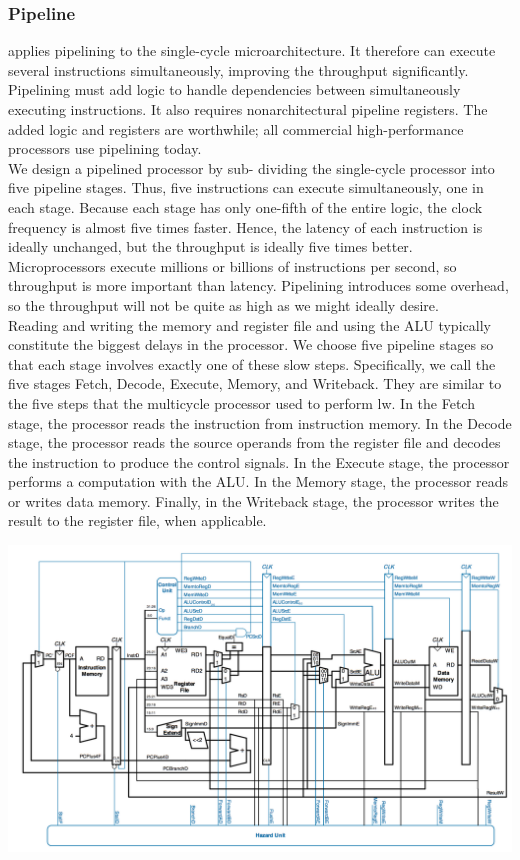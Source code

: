 		\subsubsection{Pipeline}
			applies pipelining to the single-cycle microarchitecture. It therefore can execute several instructions simultaneously, improving the throughput significantly. Pipelining must add logic to handle dependencies between simultaneously executing instructions. It also requires nonarchitectural pipeline registers. The added logic and registers are worthwhile; all commercial high-performance processors use pipelining today.\\
			We design a pipelined processor by sub- dividing the single-cycle processor into five pipeline stages. Thus, five instructions can execute simultaneously, one in each stage. Because each stage has only one-fifth of the entire logic, the clock frequency is almost five times faster. Hence, the latency of each instruction is ideally unchanged, but the throughput is ideally five times better. Microprocessors execute millions or billions of instructions per second, so throughput is more important than latency.  Pipelining introduces some overhead, so the throughput will not be quite as high as we might ideally desire.\\
			Reading and writing the memory and register file and using the ALU typically constitute the biggest delays in the processor. We choose five pipeline stages so that each stage involves exactly one of these slow steps. Specifically, we call the five stages Fetch, Decode, Execute, Memory, and Writeback. They are similar to the five steps that the multicycle processor used to perform lw. In the Fetch stage, the processor reads the instruction from instruction memory. In the Decode stage, the processor reads the source operands from the register file and decodes the instruction to produce the control signals. In the Execute stage, the processor performs a computation with the ALU. In the Memory stage, the processor reads or writes data memory. Finally, in the Writeback stage, the processor writes the result to the register file, when applicable.
			\begin{center}
				\includegraphics[width = 15cm]{images/pipeline}
			\end{center}
